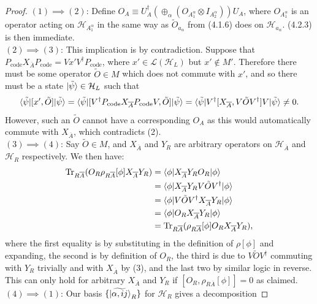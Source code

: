 \documentclass[12pt,a4paper]{report}
\numberwithin{equation}{section}
\newcommand{\Pc}{P_{\text{code}}}
\newcommand{\ol}[1]{\overline{#1}}
\newcommand{\tr}{\text{Tr}}
\theoremstyle{definition}
\theoremstyle{theorem}
\theoremstyle{theorem}
\theoremstyle{example}
\theoremstyle{definition}
\begin{document}
\begin{proof}
	$(1)\implies (2)$: Define $O_{A}\equiv U_{A}^{\dagger}(\oplus_{\alpha}(O_{A_{1}^{\alpha}}\otimes I_{A_{2}^{\alpha}}))U_{A}$, where $O_{A_{1}^{\alpha}}$ is an operator acting on $\mathcal{H}_{A_{1}^{\alpha}}$ in the same way as $\tilde{O}_{a_{\alpha}}$ from (4.1.6) does on $\mathcal{H}_{a_{\alpha}}$. (4.2.3) is then immediate.\\
	$(2)\implies (3)$: This implication is by contradiction. Suppose that $\Pc X_{\ol{A}}\Pc=Vx'V^{\dagger}\Pc$, where $x'\in\mathcal{L}(\mathcal{H}_{L})$ but $x'\notin M'$. Therefore there must be some operator $\tilde{O}\in M$ which does not commute with $x'$, and so there must be a state $\ket{\tilde{\psi}}\in\mathcal{H}_{L}$ such that
	\begin{equation}
		\braket{\tilde{\psi}|[x',\tilde{O}]|\tilde{\psi}}=\braket{\tilde{\psi}|[V^{\dagger}\Pc X_{\ol{A}}\Pc V,\tilde{O}]|\tilde{\psi}}=\braket{\tilde{\psi}|V^{\dagger}[X_{\ol{A}},V\tilde{O}V^{\dagger}]V|\tilde{\psi}}\neq 0.
	\end{equation}
	However, such an $\tilde{O}$ cannot have a corresponding $O_{A}$ as this would automatically commute with $X_{\ol{A}}$, which contradicts (2).\\
	$(3)\implies (4)$: Say $\tilde{O}\in M$, and $X_{\ol{A}}$ and $Y_{R}$ are arbitrary operators on $\mathcal{H}_{\ol{A}}$ and $\mathcal{H}_{R}$ respectively. We then have:
	\begin{equation}
		\begin{aligned}
			\tr_{R\ol{A}}(O_{R}\rho_{R\ol{A}}[\phi]X_{\ol{A}}Y_{R})&=\braket{\phi|X_{\ol{A}}Y_{R}O_{R}|\phi}\\&=\braket{\phi|X_{\ol{A}}Y_{R}V\tilde{O}V^{\dagger}|\phi}\\&=\braket{\phi|V\tilde{O}V^{\dagger}X_{\ol{A}}Y_{R}|\phi}\\&=\braket{\phi|O_{R}X_{\ol{A}}Y_{R}|\phi}\\&=\tr_{R\ol{A}}(\rho_{R\ol{A}}[\phi]O_{R}X_{\ol{A}}Y_{R}),
		\end{aligned}
	\end{equation}
	where the first equality is by substituting in the definition of $\rho[\phi]$ and expanding, the second is by definition of $O_{R}$, the third is due to $V\tilde{O}V^{\dagger}$ commuting with $Y_{R}$ trivially and with $X_{\ol{A}}$ by (3), and the last two by similar logic in reverse. This can only hold for arbitrary $X_{\ol{A}}$ and $Y_{R}$ if $[O_{R},\rho_{R\ol{A}}[\phi]]=0$ as claimed.\\
	$(4)\implies (1)$: Our basis $\{\ket{\widetilde{\alpha,ij}}_{R}\}$ for $\mathcal{H}_{R}$ gives a decomposition

\end{proof}
\end{document}
